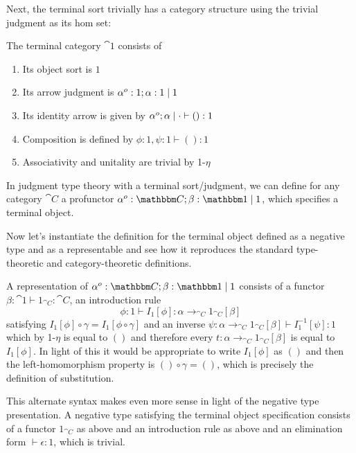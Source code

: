\documentclass{article}
\begin{document}
Next, the terminal sort trivially has a category structure using the
trivial judgment as its hom set:

\begin{definition}
  The terminal category $\cat 1$ consists of
  \begin{enumerate}
  \item Its object sort is $1$
  \item Its arrow judgment is $\alpha^o:1;\alpha:1 \mathrel{|} 1$
  \item Its identity arrow is given by $\alpha^o;\alpha \mathrel{|} \cdot \vdash () : 1$
  \item Composition is defined by $\phi : 1, \psi : 1 \vdash () : 1$
  \item Associativity and unitality are trivial by \textsc{1-$\eta$}
  \end{enumerate}
\end{definition}

\begin{definition}
  In judgment type theory with a terminal sort/judgment, we can define
  for any category $\cat C$ a profunctor $\alpha^o:\cat C;\beta : \cat
  1 \pipe 1$, which specifies a terminal object.
\end{definition}

Now let's instantiate the definition for the terminal object defined
as a negative type and as a representable and see how it reproduces
the standard type-theoretic and category-theoretic definitions.

A representation of $\alpha^o:\cat C; \beta : \cat 1 \pipe 1$ consists
of a functor $\beta : \cat 1 \vdash 1_{\cat C} : \cat C$, an introduction rule
\[ \phi : 1 \vdash I_{1}[\phi] : \alpha \to_{\cat C} 1_{\cat C}[\beta] \]
satisfying $I_{1}[\phi] \circ \gamma =I_{1}[\phi \circ \gamma]$ and an
inverse $\psi : \alpha \to_{\cat C} 1_{\cat C}[\beta] \vdash
I_{1}^{-1}[\psi] : 1$ which by \textsc{1-$\eta$} is equal to $()$ and
therefore every $t : \alpha \to_{\cat C} 1_{\cat C}[\beta]$ is equal
to $I_{1}[\phi]$. In light of this it would be appropriate to write
$I_1[\phi]$ as $()$ and then the left-homomorphism property is $()
\circ \gamma = ()$, which is precisely the definition of substitution.

This alternate syntax makes even more sense in light of the negative
type presentation. A negative type satisfying the terminal object
specification consists of a functor $1_{\cat C}$ as above and an
introduction rule as above and an elimination form $\vdash \epsilon :
1$, which is trivial.
\end{document}
